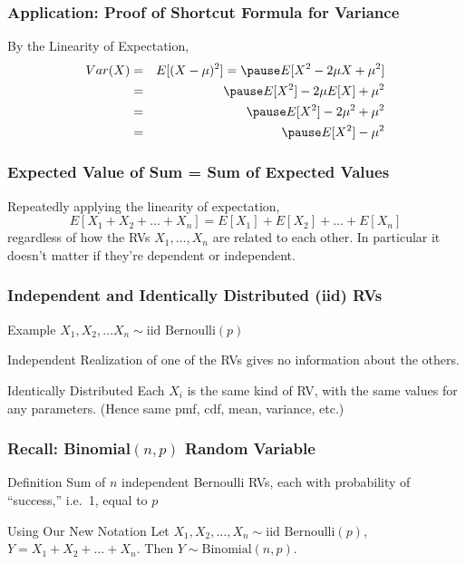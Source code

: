 \begin{frame}
\frametitle{Application: Proof of Shortcut Formula for Variance}

By the Linearity of Expectation, 
\begin{eqnarray*}
	Var(X) &=&  E[(X - \mu)^2] = \pause E[X^2 - 2\mu X + \mu^2]\\
		&=& \pause E[X^2] - 2\mu E[X] + \mu^2\\
		&=& \pause E[X^2] - 2\mu^2 + \mu^2\\
		&=& \pause E[X^2] - \mu^2
\end{eqnarray*}


\end{frame}


\begin{frame}
\frametitle{Expected Value of Sum = Sum of Expected Values}
Repeatedly applying the linearity of expectation,
$$E[X_1 + X_2 + \hdots + X_n] = E[X_1] + E[X_2] + \hdots + E[X_n]$$
regardless of how the RVs $X_1, \hdots, X_n$ are related to each other. In particular it \alert{doesn't matter if they're dependent or independent}.


\end{frame}
\begin{frame}
\frametitle{Independent and Identically Distributed (iid) RVs}

\begin{block}{Example}
	$X_1, X_2, \hdots X_n \sim \mbox{iid Bernoulli}(p)$
\end{block}

\begin{block}{Independent}
Realization of one of the RVs gives no information about the others.
\end{block}

\begin{block}{Identically Distributed}
Each $X_i$ is the same kind of RV, with the same values for any parameters. (Hence same pmf, cdf, mean, variance, etc.)
\end{block}

\end{frame}
\begin{frame}
\frametitle{Recall: Binomial$(n,p)$ Random Variable}

\begin{block}{Definition}
Sum of $n$ independent Bernoulli RVs, each with probability of ``success,'' i.e.\ 1, equal to $p$
\end{block}


\begin{alertblock}{Using Our New Notation}
Let $X_1, X_2, \hdots, X_n \sim \mbox{iid Bernoulli}(p)$, $Y = X_1 + X_2 + \hdots + X_n$. Then $Y \sim \mbox{Binomial}(n,p)$.
\end{alertblock}


\end{frame}
